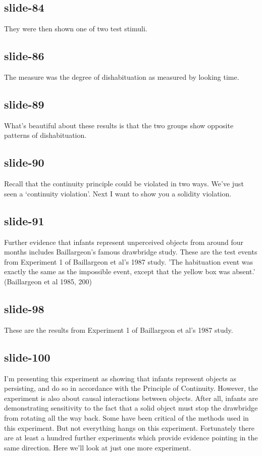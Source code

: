 \documentclass[12pt,\papersize]{extarticle}
\begin{document}
 
\subsection{slide-84}
They were then shown one of two test stimuli.
 
 
\subsection{slide-86}
The measure was the degree of dishabituation as measured by looking time.
 
 
\subsection{slide-89}
What's beautiful about these results is that the two groups show opposite patterns of dishabituation.
 
 
\subsection{slide-90}
Recall that the continuity principle could be violated in two ways.
We've just seen a `continuity violation'. Next I want to show you a solidity violation.
 
 
\subsection{slide-91}
Further evidence that infants represent unperceived objects from around four months includes Baillargeon's famous drawbridge study.
These are the test events from Experiment 1 of Baillargeon et al's 1987 study.
'The habituation event was exactly the same as the impossible event, except that the yellow box was absent.' (Baillargeon et al 1985, 200)
 
 
\subsection{slide-98}
These are the results from Experiment 1 of Baillargeon et al's 1987 study.
 
 
\subsection{slide-100}
I'm presenting this experiment as showing that infants represent objects as persisting, and do so in accordance with the Principle of Continuity. However, the experiment is also about causal interactions between objects. After all, infants are demonstrating sensitivity to the fact that a solid object must stop the drawbridge from rotating all the way back.
Some have been critical of the methods used in this experiment. But not everything hangs on this experiment. Fortunately there are at least a hundred further experiments which provide evidence pointing in the same direction. Here we'll look at just one more experiment.
 
\end{document}

